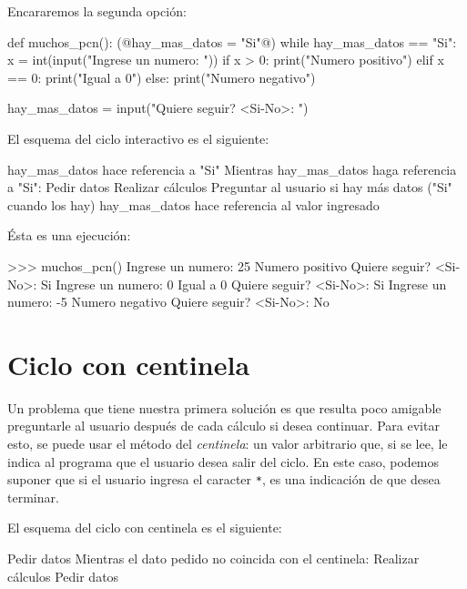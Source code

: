 Encararemos la segunda opción:

\begin{codigo-python-sn}
def muchos_pcn():
    (@hay_mas_datos = "Si"@)
    while hay_mas_datos == "Si":
        x = int(input("Ingrese un numero: "))
        if x > 0:
            print("Numero positivo")
        elif x == 0:
            print("Igual a 0")
        else:
            print("Numero negativo")

        hay_mas_datos = input("Quiere seguir? <Si-No>: ")
\end{codigo-python-sn}

El esquema del ciclo interactivo es el siguiente:

\begin{codigo-nohl-sn}
hay_mas_datos hace referencia a "Si"
Mientras hay_mas_datos haga referencia a "Si":
    Pedir datos
    Realizar cálculos
    Preguntar al usuario si hay más datos ("Si" cuando los hay)
    hay_mas_datos hace referencia al valor ingresado
\end{codigo-nohl-sn}

Ésta es una ejecución:

\begin{codigo-python-sn}
>>> muchos_pcn()
Ingrese un numero: 25
Numero positivo
Quiere seguir? <Si-No>: Si
Ingrese un numero: 0
Igual a 0
Quiere seguir? <Si-No>: Si
Ingrese un numero: -5
Numero negativo
Quiere seguir? <Si-No>: No
\end{codigo-python-sn}

\section{Ciclo con centinela}
\label{centinela}

Un problema que tiene nuestra primera solución es que resulta poco amigable
preguntarle al usuario después de cada cálculo si desea continuar. Para evitar
esto, se puede usar el método del \emph{centinela}: un valor arbitrario que, si
se lee, le indica al programa que el usuario desea salir del ciclo. En este
caso, podemos suponer que si el usuario ingresa el caracter \lstinline!*!, es
una indicación de que desea terminar.

El esquema del ciclo con centinela es el siguiente:

\begin{codigo-nohl-sn}
Pedir datos
Mientras el dato pedido no coincida con el centinela:
    Realizar cálculos
    Pedir datos
\end{codigo-nohl-sn}

